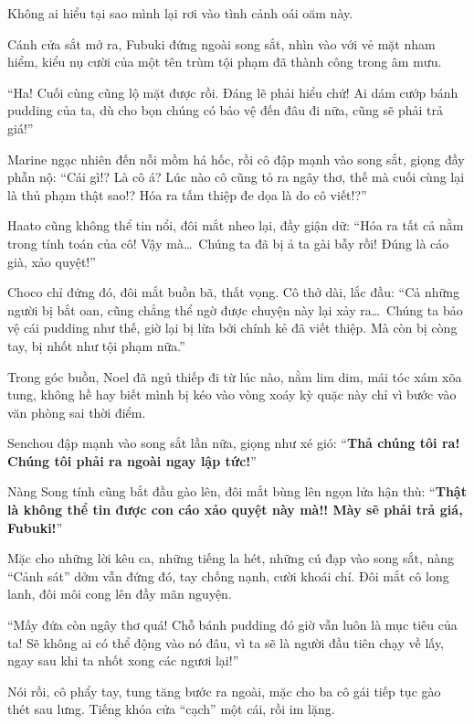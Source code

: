 \documentclass[../main.tex]{subfiles}
\begin{document}
Không ai hiểu tại sao mình lại rơi vào tình cảnh oái oăm này.


Cánh cửa sắt mở ra, Fubuki đứng ngoài song sắt, nhìn vào với vẻ mặt nham hiểm, kiểu nụ cười của một tên trùm tội phạm đã thành công trong âm mưu.

``Ha! Cuối cùng cũng lộ mặt được rồi. Đáng lẽ phải hiểu chứ! Ai dám cướp bánh pudding của ta, dù cho bọn chúng có bảo vệ đến đâu đi nữa, cũng sẽ phải trả giá!''

Marine ngạc nhiên đến nỗi mồm há hốc, rồi cô đập mạnh vào song sắt, giọng đầy phẫn nộ: ``Cái gì!? Là cô á? Lúc nào cô cũng tỏ ra ngây thơ, thế mà cuối cùng lại là thủ phạm thật sao!? Hóa ra tấm thiệp đe dọa là do cô viết!?''

Haato cũng không thể tin nổi, đôi mắt nheo lại, đầy giận dữ: ``Hóa ra tất cả nằm trong tính toán của cô! Vậy mà\dots\ Chúng ta đã bị ả ta gài bẫy rồi! Đúng là cáo già, xảo quyệt!''

Choco chỉ đứng đó, đôi mắt buồn bã, thất vọng. Cô thở dài, lắc đầu: ``Cả những người bị bắt oan, cũng chẳng thể ngờ được chuyện này lại xảy ra\dots\ Chúng ta bảo vệ cái pudding như thế, giờ lại bị lừa bởi chính kẻ đã viết thiệp. Mà còn bị còng tay, bị nhốt như tội phạm nữa.''

Trong góc buồn, Noel đã ngủ thiếp đi từ lúc nào, nằm lim dim, mái tóc xám xõa tung, không hề hay biết mình bị kéo vào vòng xoáy kỳ quặc này chỉ vì bước vào văn phòng sai thời điểm.

Senchou đập mạnh vào song sắt lần nữa, giọng như xé gió: ``\textbf{Thả chúng tôi ra! Chúng tôi phải ra ngoài ngay lập tức!}''

Nàng Song tính cũng bắt đầu gào lên, đôi mắt bùng lên ngọn lửa hận thù: ``\textbf{Thật là không thể tin được con cáo xảo quyệt này mà!! Mày sẽ phải trả giá, Fubuki!}''

Mặc cho những lời kêu ca, những tiếng la hét, những cú đạp vào song sắt, nàng ``Cảnh sát'' dởm vẫn đứng đó, tay chống nạnh, cười khoái chí. Đôi mắt cô long lanh, đôi môi cong lên đầy mãn nguyện.

``Mấy đứa còn ngây thơ quá! Chỗ bánh pudding đó giờ vẫn luôn là mục tiêu của ta! Sẽ không ai có thể động vào nó đâu, vì ta sẽ là người đầu tiên chạy về lấy, ngay sau khi ta nhốt xong các ngươi lại!''

Nói rồi, cô phẩy tay, tung tăng bước ra ngoài, mặc cho ba cô gái tiếp tục gào thét sau lưng. Tiếng khóa cửa ``cạch'' một cái, rồi im lặng.
\end{document}
